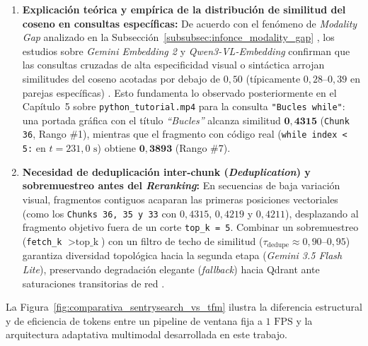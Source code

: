 \begin{enumerate}
    \item \textbf{Explicación teórica y empírica de la distribución de similitud del coseno en consultas específicas:}
    De acuerdo con el fenómeno de \textit{Modality Gap} analizado en la Subsección~\ref{subsubsec:infonce_modality_gap} \cite{liang2022modalitygap}, los estudios sobre \textit{Gemini Embedding 2} y \textit{Qwen3-VL-Embedding} confirman que las consultas cruzadas de alta especificidad visual o sintáctica arrojan similitudes del coseno acotadas por debajo de $0,50$ (típicamente $0,28\text{--}0,39$ en parejas específicas) \cite{sentrysearch2026}. %
    Esto fundamenta lo observado posteriormente en el Capítulo~5 sobre \texttt{python\_tutorial.mp4} para la consulta \texttt{"Bucles while"}: una portada gráfica con el título \textit{``Bucles''} alcanza similitud $\mathbf{0,4315}$ (\texttt{Chunk 36}, Rango \#1), mientras que el fragmento con código real (\texttt{while index < 5:} en $t = 231,0\text{ s}$) obtiene $\mathbf{0,3893}$ (Rango \#7). %

    \newpage
    \item \textbf{Necesidad de deduplicación inter-chunk (\textit{Deduplication}) y sobremuestreo antes del \textit{Reranking}:}
    En secuencias de baja variación visual, fragmentos contiguos acaparan las primeras posiciones vectoriales (como los \texttt{Chunks 36, 35 y 33} con $0,4315$, $0,4219$ y $0,4211$), desplazando al fragmento objetivo fuera de un corte \texttt{top\_k = 5}. %
    Combinar un sobremuestreo (\texttt{fetch\_k} $> \text{top\_k}$) con un filtro de techo de similitud ($\tau_{\text{dedupe}} \approx 0,90\text{--}0,95$) garantiza diversidad topológica hacia la segunda etapa (\textit{Gemini 3.5 Flash Lite}), preservando degradación elegante (\textit{fallback}) hacia Qdrant ante saturaciones transitorias de red \cite{sentrysearch2026}. %
\end{enumerate}

La Figura~\ref{fig:comparativa_sentrysearch_vs_tfm} ilustra la diferencia estructural y de eficiencia de tokens entre un pipeline de ventana fija a $1\text{ FPS}$ y la arquitectura adaptativa multimodal desarrollada en este trabajo. %


